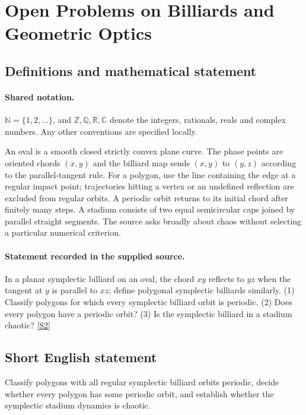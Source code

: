 \documentclass[11pt]{article}
\newcommand{\sref}[2]{\hyperlink{source:#1:#2}{[S#2]}}
\begin{document}
\section{Open Problems on Billiards and Geometric Optics}\label{statement}

\subsection{Definitions and mathematical statement}

\paragraph{Shared notation.}$\mathbb N=\{1,2,\ldots\}$, and $\mathbb Z,\mathbb Q,\mathbb R,\mathbb C$ denote the integers, rationals, reals and complex numbers. Any other conventions are specified locally.


An oval is a smooth closed strictly convex plane curve. The phase points are oriented chords $(x,y)$ and the billiard map sends $(x,y)$ to $(y,z)$ according to the parallel-tangent rule. For a polygon, use the line containing the edge at a regular impact point; trajectories hitting a vertex or an undefined reflection are excluded from regular orbits. A periodic orbit returns to its initial chord after finitely many steps. A stadium consists of two equal semicircular caps joined by parallel straight segments. The source asks broadly about chaos without selecting a particular numerical criterion.
\paragraph{Statement recorded in the supplied source.}
In a planar symplectic billiard on an oval, the chord $xy$ reflects to $yz$ when the tangent at $y$ is parallel to $xz$; define polygonal symplectic billiards similarly. (1) Classify polygons for which every symplectic billiard orbit is periodic. (2) Does every polygon have a periodic orbit? (3) Is the symplectic billiard in a stadium chaotic? \sref{statement}{2}
\subsection{Short English statement}
Classify polygons with all regular symplectic billiard orbits periodic, decide whether every polygon has some periodic orbit, and establish whether the symplectic stadium dynamics is chaotic.
\end{document}
